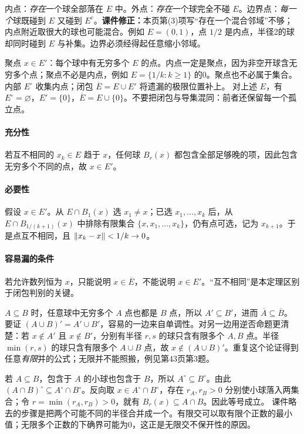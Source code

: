 内点：\emph{存在}一个球全部落在 $E$ 中。外点：\emph{存在}一个球完全不碰 $E$。边界点：\emph{每一个}球既碰到 $E$ 又碰到 $E^c$。\textbf{课件修正：}本页第(3)项写``存在一个混合邻域''不够；内点附近取很大的球也可能混合。例如 $E=(0,1)$，点 $1/2$ 是内点，半径2的球却同时碰到 $E$ 与补集。边界必须经得起任意缩小邻域。

聚点 $x\in E'$：每个球中有无穷多个 $E$ 的点。内点一定是聚点，因为非空开球含无穷多个点；聚点不必是内点，例如 $E=\{1/k:k\ge1\}$ 的0。聚点也不必属于集合。内部 $E^\circ$ 收集内点；闭包 $\overline E=E\cup E'$ 将遗漏的极限位置补上。
对上述 $E$，有 $E^\circ=\varnothing$，$E'=\{0\}$，$\overline E=E\cup\{0\}$。不要把闭包与导集混同：前者还保留每一个孤立点。

\paragraph{充分性}若互不相同的 $x_k\in E$ 趋于 $x$，任何球 $B_r(x)$ 都包含全部足够晚的项，因此包含无穷多个不同的点，故 $x\in E'$。
\paragraph{必要性}假设 $x\in E'$。从 $E\cap B_1(x)$ 选 $x_1\ne x$；已选 $x_1,\ldots,x_k$ 后，从 $E\cap B_{1/(k+1)}(x)$ 中排除有限集合 $\{x,x_1,\ldots,x_k\}$，仍有点可选，记为 $x_{k+1}$。于是点互不相同，且 $\left\lVert x_k-x\right\rVert<1/k\to0$。
\paragraph{容易漏的条件}若允许数列恒为 $x$，只能说明 $x\in\overline E$，不能说明 $x\in E'$。``互不相同''是本定理区别于闭包判别的关键。

$A\subseteq B$ 时，任意球中无穷多个 $A$ 点也都是 $B$ 点，所以 $A'\subseteq B'$，进而 $\overline A\subseteq\overline B$。
要证 $(A\cup B)'=A'\cup B'$，容易的一边来自单调性。对另一边用逆否命题更清楚：若 $x\notin A'$ 且 $x\notin B'$，分别有半径 $r,s$ 的球只含有限多个 $A,B$ 点。半径 $\min(r,s)$ 的球只含有限多个 $A\cup B$ 点，故 $x\notin(A\cup B)'$。重复这个论证得到任意\emph{有限}并的公式；无限并不能照搬，例见第43页第3题。

若 $A\subseteq B$，包含于 $A$ 的小球也包含于 $B$，所以 $A^\circ\subseteq B^\circ$。由此 $(A\cap B)^\circ\subseteq A^\circ\cap B^\circ$。反向取 $x\in A^\circ\cap B^\circ$，存在 $r_A,r_B>0$ 分别使小球落入两集合；令 $r=\min(r_A,r_B)>0$，就有 $B_r(x)\subseteq A\cap B$。因此等号成立。
课件略去的步骤是把两个可能不同的半径合并成一个。有限交可以取有限个正数的最小值；无限多个正数的下确界可能为0，这正是无限交不保开性的原因。

